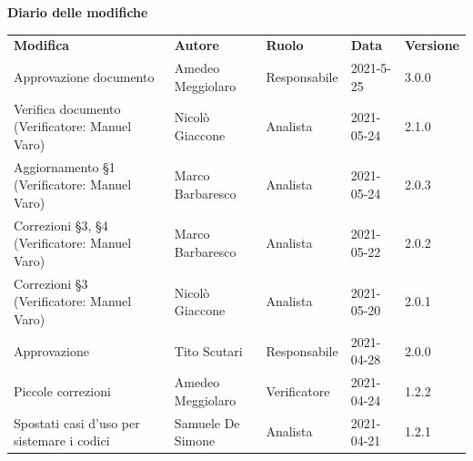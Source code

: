 \documentclass[a4paper]{article}
\begin{document}
\begin{center}
    \centering
    \textbf{\Large Diario delle modifiche}\\
    \vspace{10px}
    \renewcommand{\arraystretch}{1.8}
    \label{tab:RequisitiFunzionali}
    \begin{longtable}[!h]{p{160px} p{90px} p{60px} p{60px} p{50px}}
        \rowcolor{logo!70} \textbf{Modifica}                     & \textbf{Autore}                            & \textbf{Ruolo}                 & \textbf{Data} & \textbf{Versione} \\
        Approvazione documento                                   & Amedeo Meggiolaro                          & Responsabile                   & 2021-5-25     & 3.0.0             \\
        Verifica documento \newline (Verificatore: Manuel Varo)  & Nicolò Giaccone                            & Analista                       & 2021-05-24    & 2.1.0             \\
        Aggiornamento \S1 \newline (Verificatore: Manuel Varo)   & Marco Barbaresco                           & Analista                       & 2021-05-24    & 2.0.3             \\
        Correzioni \S3, \S4 \newline (Verificatore: Manuel Varo) & Marco Barbaresco                           & Analista                       & 2021-05-22    & 2.0.2             \\
        Correzioni \S3 \newline (Verificatore: Manuel Varo)      & Nicolò Giaccone                            & Analista                       & 2021-05-20    & 2.0.1             \\
        Approvazione                                             & Tito Scutari                               & Responsabile                   & 2021-04-28    & 2.0.0             \\
        Piccole correzioni                                       & Amedeo Meggiolaro                          & Verificatore                   & 2021-04-24    & 1.2.2             \\
        Spostati casi d'uso per sistemare i codici               & Samuele De Simone                          & Analista                       & 2021-04-21    & 1.2.1             \\

\end{longtable}
\end{center}
\end{document}
